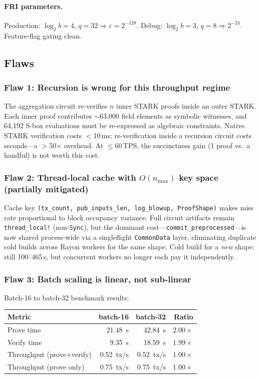 \documentclass[11pt]{article}
\begin{document}
\paragraph{FRI parameters.}
Production: $\log_2 b = 4$, $q = 32 \Rightarrow \varepsilon = 2^{-128}$.
Debug: $\log_2 b = 3$, $q = 8 \Rightarrow 2^{-24}$. Feature-flag gating clean.

\subsection{Flaws}

\subsubsection{Flaw 1: Recursion is wrong for this throughput regime}

The aggregation circuit re-verifies $n$ inner STARK proofs inside an outer
STARK. Each inner proof contributes $\sim$63{,}000 field elements as symbolic
witnesses, and 64{,}192 S-box evaluations must be re-expressed as algebraic
constraints. Native STARK verification costs $<$10\,ms; re-verification
inside a recursion circuit costs seconds---a $>$50$\times$ overhead.
At $\le$60\,TPS, the succinctness gain (1 proof vs.\ a handful) is not worth
this cost.

\subsubsection{Flaw 2: Thread-local cache with $O(n_{\max})$ key space (partially mitigated)}

Cache key \texttt{(tx\_count, pub\_inputs\_len, log\_blowup, ProofShape)}
makes miss rate proportional to block occupancy variance. Full circuit
artifacts remain \texttt{thread\_local!} (non-\texttt{Sync}), but the
dominant cost---\texttt{commit\_preprocessed}---is now shared
process-wide via a singleflight \texttt{CommonData} layer, eliminating
duplicate cold builds across Rayon workers for the same shape.
Cold build for a \emph{new} shape: still 100--465\,s, but concurrent
workers no longer each pay it independently.

\subsubsection{Flaw 3: Batch scaling is linear, not sub-linear}

Batch-16 to batch-32 benchmark results:
\begin{center}
\begin{tabular}{@{}lrrr@{}}
\toprule
\textbf{Metric} & \textbf{batch-16} & \textbf{batch-32} &
  \textbf{Ratio} \\
\midrule
Prove time & 21.48~s & 42.84~s & $2.00\times$ \\
Verify time & 9.35~s & 18.59~s & $1.99\times$ \\
Throughput (prove$+$verify) & 0.52~tx/s & 0.52~tx/s & $1.00\times$ \\
Throughput (prove only) & 0.75~tx/s & 0.75~tx/s & $1.00\times$ \\
\bottomrule
\end{tabular}
\end{center}
\end{document}
